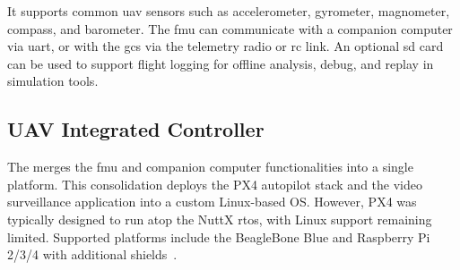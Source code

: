 It supports common \gls{uav} sensors such as accelerometer, gyrometer,
magnometer, compass, and barometer.
The \gls{fmu} can communicate with a companion computer via \gls{uart}, or with
the \gls{gcs} via the telemetry radio or \gls{rc} link. An optional \gls{sd}
card can be used to support flight logging for offline analysis, debug, and
replay in simulation tools.

\subsection{UAV Integrated Controller}
\label{sec:uav-integr-contr}
The  merges the \gls{fmu} and companion computer functionalities
into a single platform. This consolidation deploys the PX4 autopilot stack and
the video surveillance application into a custom Linux-based OS. However, PX4 was
typically designed to run atop the NuttX \gls{rtos}, with Linux support remaining
limited. Supported platforms include the BeagleBone Blue and Raspberry Pi 2/3/4
with additional shields~\cite{px4-experimental-autopilot}. 





